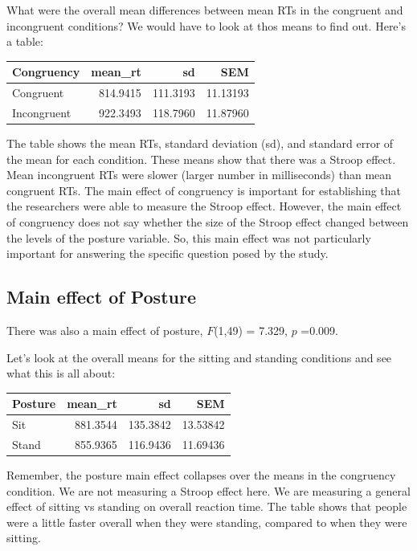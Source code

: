 \documentclass[
]{book}
\begin{document}
What were the overall mean differences between mean RTs in the congruent and incongruent conditions? We would have to look at thos means to find out. Here's a table:

\begin{tabular}{l|r|r|r}
\hline
Congruency & mean\_rt & sd & SEM\\
\hline
Congruent & 814.9415 & 111.3193 & 11.13193\\
\hline
Incongruent & 922.3493 & 118.7960 & 11.87960\\
\hline
\end{tabular}

The table shows the mean RTs, standard deviation (sd), and standard error of the mean for each condition. These means show that there was a Stroop effect. Mean incongruent RTs were slower (larger number in milliseconds) than mean congruent RTs. The main effect of congruency is important for establishing that the researchers were able to measure the Stroop effect. However, the main effect of congruency does not say whether the size of the Stroop effect changed between the levels of the posture variable. So, this main effect was not particularly important for answering the specific question posed by the study.

\subsection{Main effect of Posture}\label{main-effect-of-posture}

There was also a main effect of posture, \(F\)(1,49) = 7.329, \(p\) =0.009.

Let's look at the overall means for the sitting and standing conditions and see what this is all about:

\begin{tabular}{l|r|r|r}
\hline
Posture & mean\_rt & sd & SEM\\
\hline
Sit & 881.3544 & 135.3842 & 13.53842\\
\hline
Stand & 855.9365 & 116.9436 & 11.69436\\
\hline
\end{tabular}

Remember, the posture main effect collapses over the means in the congruency condition. We are not measuring a Stroop effect here. We are measuring a general effect of sitting vs standing on overall reaction time. The table shows that people were a little faster overall when they were standing, compared to when they were sitting.
\end{document}
